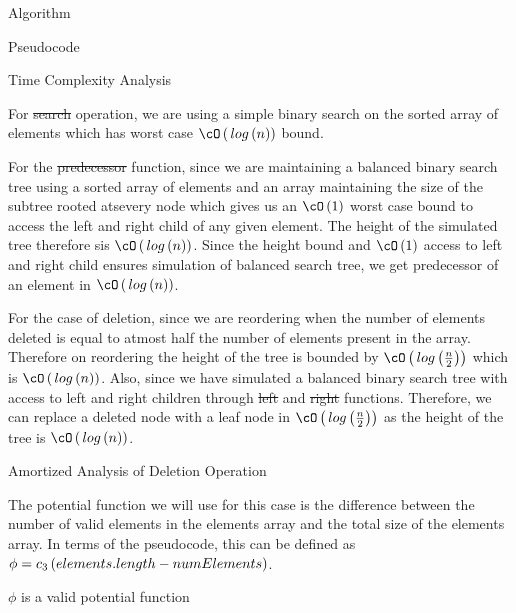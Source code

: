 \documentclass{article}
\begin{document}
\begin{question}
\begin{qsection}{Algorithm}
\begin{qsubsection}{Pseudocode}
        \end{qsubsection}
    \end{qsection}

    \clearpage

    \begin{qsection}{Time Complexity Analysis}

        For \st{search} operation, we are using a simple binary search on the sorted array of elements which has worst case $\bigO{\log{n}}$ bound. \br%

        For the \st{predecessor} function, since we are maintaining a balanced binary search tree using a sorted array of elements and an array maintaining the size of the subtree rooted atsevery node which gives us an $\bigO{1}$ worst case bound to access the left and right child of any given element. The height of the simulated tree therefore sis $\bigO{\log{n}}$. Since the height bound and $\bigO{1}$ access to left and right child ensures simulation of balanced search tree, we get predecessor of an element in $\bigO{\log{n}}$. \br%

        For the case of deletion, since we are reordering when the number of elements deleted is equal to atmost half the number of elements present in the array. Therefore on reordering the height of the tree is bounded by $\bigO{\log{\frac{n}{2}}}$ which is $\bigO{\log{n}}$. Also, since we have simulated a balanced binary search tree with access to left and right children through \st{left} and \st{right} functions. Therefore, we can replace a deleted node with a leaf node in $\bigO{\log{\frac{n}{2}}}$ as the height of the tree is $\bigO{\log{n}}$.

        \begin{qsubsection}{Amortized Analysis of Deletion Operation}

            The potential function we will use for this case is the difference between the number of valid elements in the elements array and the total size of the elements array. In terms of the pseudocode, this can be defined as $\phi = c_3 \left( {elements.length - numElements} \right)$. \br%

             \br%

             \br%

            \begin{qproof}{$\phi$ is a valid potential function}


\end{qproof}
\end{qsubsection}
\end{qsection}
\end{question}
\end{document}
